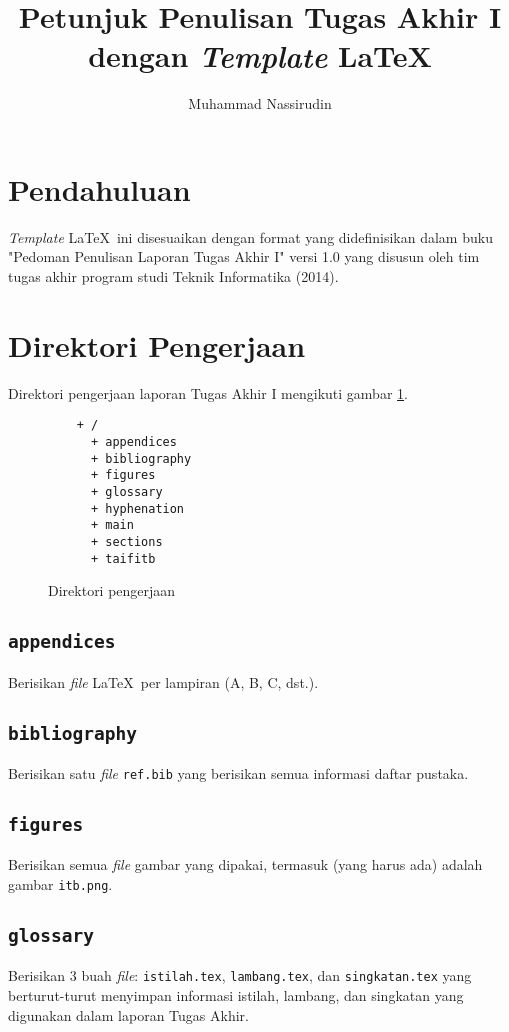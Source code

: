 \documentclass[11pt,a4paper]{article}
\title{Petunjuk Penulisan Tugas Akhir I\\dengan \textit{Template} \LaTeX}
\author{Muhammad Nassirudin}
\begin{document}
\maketitle
\tableofcontents

\section{Pendahuluan}
\textit{Template} \LaTeX\ ini disesuaikan dengan format yang didefinisikan dalam buku "Pedoman Penulisan Laporan Tugas Akhir I" versi 1.0 yang disusun oleh tim tugas akhir program studi Teknik Informatika (2014).

\section{Direktori Pengerjaan}
Direktori pengerjaan laporan Tugas Akhir I mengikuti gambar \ref{gbr:direktori_pengerjaan}.

\begin{figure}[htbp]
	\begin{verbatim}
	+ /
	  + appendices
	  + bibliography
	  + figures
	  + glossary
	  + hyphenation
	  + main
	  + sections
	  + taifitb
	\end{verbatim}
	\caption{Direktori pengerjaan}
	\label{gbr:direktori_pengerjaan}
\end{figure}

\subsection{\tt appendices}
Berisikan \textit{file} \LaTeX\ per lampiran (A, B, C, dst.).

\subsection{\tt bibliography}
Berisikan satu \textit{file} \verb|ref.bib| yang berisikan semua informasi daftar pustaka.

\subsection{\tt figures}
Berisikan semua \textit{file} gambar yang dipakai, termasuk (yang harus ada) adalah gambar \verb|itb.png|.

\subsection{\tt glossary}
Berisikan 3 buah \textit{file}: \verb|istilah.tex|, \verb|lambang.tex|, dan \verb|singkatan.tex| yang berturut-turut menyimpan informasi istilah, lambang, dan singkatan yang digunakan dalam laporan Tugas Akhir.
\end{document}
